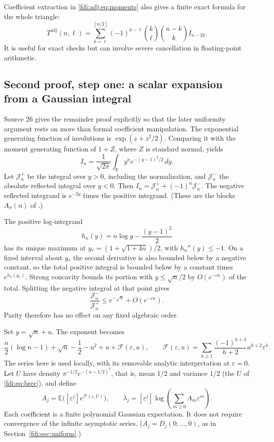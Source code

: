 \documentclass[11pt,letterpaper]{article}
\theoremstyle{remark}\newtheorem{remark}[theorem]{Remark}
\newcommand{\E}{\mathbb E}\newcommand{\Prb}{\mathbb P}\newcommand{\R}{\mathbb R}\newcommand{\C}{\mathbb C}
\newcommand{\eps}{\varepsilon}\newcommand{\Pois}{\operatorname{Poisson}}
\newcommand{\floor}[1]{\left\lfloor #1\right\rfloor}
\newcommand{\Tadj}{T^{\mathrm{adj}}}
\begin{document}
Coefficient extraction in \eqref{fdi:adj:eq:moments} also gives a finite exact formula for the whole triangle:
\begin{equation}\label{fdi:adj:eq:triangle}
 \Tadj(n,\ell)=\sum_{k=\ell}^{\floor{n/2}}
 (-1)^{k-\ell}\binom{k}{\ell}\binom{n-k}{k}I_{n-2k}.
\end{equation}
It is useful for exact checks but can involve severe cancellation in floating-point arithmetic.

\subsection{Second proof, step one: a scalar expansion from a Gaussian integral}\label{fdi:adj:sec:scalar}
Source 26 gives the remainder proof explicitly so that the later uniformity argument rests on more than formal coefficient manipulation. The exponential generating function of involutions is $\exp(z+z^2/2)$. Comparing it with the moment generating function of $1+Z$, where $Z$ is standard normal, yields
\begin{equation}\label{fdi:adj:eq:gaussian}
 I_n=\frac1{\sqrt{2\pi}}\int_{\mathbb R}y^n e^{-(y-1)^2/2}\,dy.
\end{equation}
Let $\mathcal J_n^+$ be the integral over $y>0$, including the normalization, and $\mathcal J_n^-$ the absolute reflected integral over $y<0$. Then $I_n=\mathcal J_n^++(-1)^n\mathcal J_n^-$. The negative reflected integrand is $e^{-2y}$ times the positive integrand. (These are the blocks $A_\sigma(n)$ of \cite[\texttt{t2:eq:involution-A}]{cti}.)

The positive log-integrand
\[
 h_n(y)=n\log y-\frac{(y-1)^2}{2}
\]
has its unique maximum at $y_*=(1+\sqrt{1+4n})/2$, with $h_n''(y)\le-1$. On a fixed interval about $y_*$ the second derivative is also bounded below by a negative constant, so the total positive integral is bounded below by a constant times $e^{h_n(y_*)}$. Strong concavity bounds its portion with $y\le\sqrt n/2$ by $O(e^{-cn})$ of the total. Splitting the negative integral at that point gives
\begin{equation}\label{fdi:adj:eq:negative-negligible}
 \frac{\mathcal J_n^-}{\mathcal J_n^+}\le e^{-\sqrt n}+O(e^{-cn}).
\end{equation}
Parity therefore has no effect on any fixed algebraic order.

Set $y=\sqrt n+u$. The exponent becomes
\[
 \frac n2(\log n-1)+\sqrt n-\frac12-u^2+u+\mathcal F(\eps,u),
 \qquad
 \mathcal F(\eps,u)=\sum_{h\ge1}\frac{(-1)^{h+3}}{h+2}u^{h+2}\eps^h.
\]
The series here is used locally, with its removable analytic interpretation at $\eps=0$. Let $U$ have density $\pi^{-1/2}e^{-(u-1/2)^2}$, that is, mean $1/2$ and variance $1/2$ (the $U$ of \eqref{fdi:eq:brec}), and define
\begin{equation}\label{fdi:adj:eq:Aj}
 A_j=\E\bigl([\eps^j]e^{\mathcal F(\eps,U)}\bigr),\qquad
 \lambda_j=[\eps^j]\log\left(\sum_{m\ge0}A_m\eps^m\right).
\end{equation}
Each coefficient is a finite polynomial Gaussian expectation. It does not require convergence of the infinite asymptotic series. ($A_j=D_j(0,\ldots,0)$, as in Section~\ref{fdi:sec:uniform}.)
\end{document}
